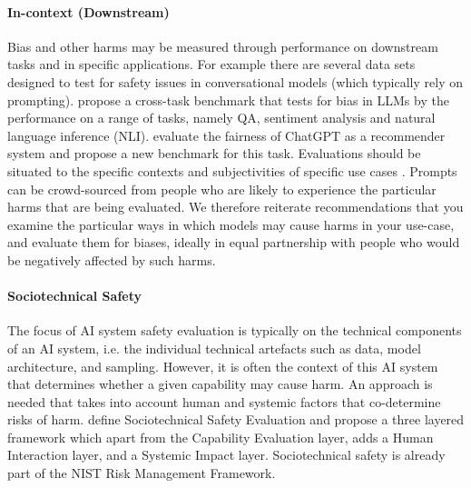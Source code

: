 \paragraph{In-context (Downstream)}
Bias and other harms may be measured through performance on downstream tasks and in specific applications. 
For example there are several data sets designed to test for safety issues in conversational models \citep{smith_im_2022,ung_saferdialogues_2022,dinan_safetykit_2022, barikeri_redditbias_2021} (which typically rely on prompting). 
\citet{gupta_calm_2024} propose a cross-task benchmark that tests for bias in LLMs by the performance on a range of tasks, namely QA, sentiment analysis and natural language inference (NLI). 
\citet{zhang_is_2023} evaluate the fairness of ChatGPT as a recommender system and propose a new benchmark for this task. 
Evaluations should be situated to the specific contexts and subjectivities of specific use cases \cite{blodgett_language_2020,Talat_You_2022}. 
Prompts can be crowd-sourced from people who are likely to experience the particular harms that are being evaluated.
We therefore reiterate recommendations that you examine the particular ways in which models may cause harms in your use-case, and evaluate them for biases, ideally in equal partnership with people who would be negatively affected by such harms.

\paragraph{Sociotechnical Safety}
The focus of AI system safety evaluation is typically on the technical components of an AI system, i.e. the individual technical artefacts such as data, model architecture, and sampling. 
However, it is often the context of this AI system that determines whether a given capability may cause harm. 
An approach is needed that takes into account human and systemic factors that co-determine risks of harm. \citet{weidinger2023sociotechnical} define Sociotechnical Safety Evaluation and propose a three layered framework which apart from the Capability Evaluation layer, adds a Human Interaction layer, and a Systemic Impact layer. Sociotechnical safety is already part of the NIST Risk Management Framework. 

